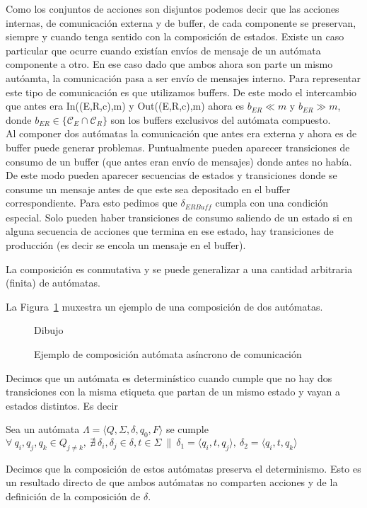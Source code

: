 Como los conjuntos de acciones son disjuntos podemos decir que las acciones internas, de comunicación externa y de buffer, de cada componente se preservan, siempre y cuando tenga sentido con la composición de estados. Existe un caso particular que ocurre cuando existían envíos de mensaje de un autómata componente a otro. En ese caso dado que ambos ahora son parte un mismo autóamta, la comunicación pasa a ser envío de mensajes interno. Para representar este tipo de comunicación es que utilizamos buffers. De este modo el intercambio que antes era In((E,R,c),m) y Out((E,R,c),m) ahora es $b_{ER}  \ll m$ y $b_{ER}  \gg  m$, donde $ b_{ER} \in \{ \mathcal{C}_E \cap \mathcal{C}_R \} $ son los buffers exclusivos del autómata compuesto. \\

Al componer dos autómatas la comunicación que antes era externa y ahora es de buffer puede generar problemas. Puntualmente pueden aparecer transiciones de consumo de un buffer (que antes eran envío de mensajes) donde antes no había. De este modo pueden aparecer secuencias de estados y transiciones donde se consume un mensaje antes de que este sea depositado en el buffer correspondiente. Para esto pedimos que $\delta_\mathit{ERBuff}$ cumpla con una condición especial. Solo pueden haber transiciones de consumo saliendo de un estado si en alguna secuencia de acciones que termina en ese estado, hay transiciones de producción (es decir se encola un mensaje en el buffer).

La composición es conmutativa y se puede generalizar a una cantidad arbitraria (finita) de autómatas.



La Figura~\ref{fig:ejemplo-aa} muxestra un ejemplo de una composición de dos autómatas. 

\begin{figure}[ht]
\begin{center}
Dibujo
\end{center}
\caption{Ejemplo de composición autómata asíncrono de comunicación}
\label{fig:ejemplo-aa}
\end{figure} 

\begin{definition}[Determinismo] Decimos que un autómata es determinístico cuando cumple que no hay dos transiciones con la misma etiqueta que partan de un mismo estado y vayan a estados distintos. Es decir 

\begin{centering}
Sea un autómata $ \Lambda = \langle Q, \Sigma, \delta, q_0, F \rangle$ se cumple
$ \forall \  q_i, q_j, q_k \in Q_{j \neq k}, \  \nexists \ \delta_i, \delta_j \in \delta, t \in \Sigma \ \| \  \delta_1 = \langle q_i, t, q_j \rangle, \ \delta_2 = \langle q_i, t, q_k \rangle$ \\
\end{centering} 

Decimos que la composición de estos autómatas preserva el determinismo. Esto es un resultado directo de que ambos autómatas no comparten acciones y de la definición de la composición de $\delta$.

\end{definition}


